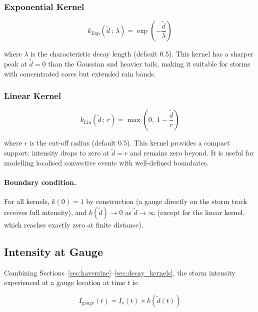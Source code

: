 \documentclass[11pt,a4paper]{article}
\begin{document}
\subsubsection{Exponential Kernel}
\begin{equation}
    k_{\text{Exp}}(\tilde{d}\,;\,\lambda) =
        \exp\!\left(-\frac{\tilde{d}}{\lambda}\right)
    \label{eq:exponential_kernel}
\end{equation}

\noindent where $\lambda$ is the characteristic decay length (default 0.5). This
kernel has a sharper peak at $\tilde{d}=0$ than the Gaussian and heavier tails,
making it suitable for storms with concentrated cores but extended rain bands.

\subsubsection{Linear Kernel}
\begin{equation}
    k_{\text{Lin}}(\tilde{d}\,;\,r) =
        \max\!\left(0,\; 1 - \frac{\tilde{d}}{r}\right)
    \label{eq:linear_kernel}
\end{equation}

\noindent where $r$ is the cut-off radius (default 0.5). This kernel provides a
compact support: intensity drops to zero at $\tilde{d} = r$ and remains zero
beyond. It is useful for modelling localised convective events with well-defined
boundaries.

\paragraph{Boundary condition.} For all kernels, $k(0) = 1$ by construction
(a gauge directly on the storm track receives full intensity), and
$k(\tilde{d}) \to 0$ as $\tilde{d} \to \infty$ (except for the linear kernel,
which reaches exactly zero at finite distance).

\subsection{Intensity at Gauge}
\label{sec:intensity_at_gauge}

Combining Sections~\ref{sec:haversine}--\ref{sec:decay_kernels}, the storm
intensity experienced at a gauge location at time $t$ is:

\begin{equation}
    I_{\text{gauge}}(t) = I_s(t) \times k\!\left(\tilde{d}(t)\right)
    \label{eq:intensity_at_gauge}
\end{equation}
\end{document}

